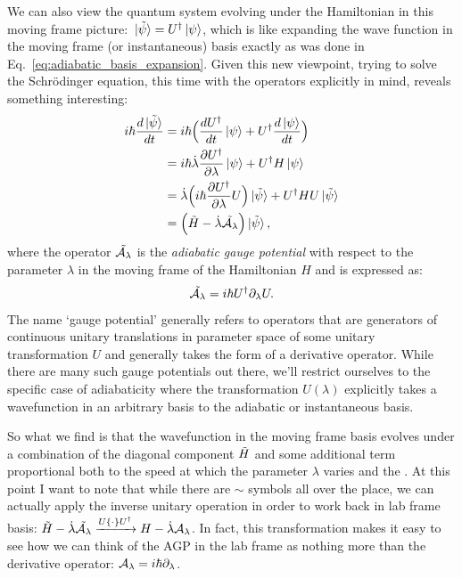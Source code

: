     We can also view the quantum system evolving under the Hamiltonian in this moving frame picture: $\ket*{\Tilde{\psi}} = U^{\dagger}\ket{\psi}$, which is like expanding the wave function in the moving frame (or instantaneous) basis exactly as was done in Eq.~\eqref{eq:adiabatic_basis_expansion}. Given this new viewpoint, trying to solve the Schr\"{o}dinger equation, this time with the operators explicitly in mind, reveals something interesting:
    \begin{equation}\label{eq:moving_frame_schrodinger}
        \begin{aligned}
            i \hbar \frac{d \ket*{\Tilde{\psi}}}{dt} &= i \hbar \Big( \frac{d U^{\dagger}}{dt}\ket*{\psi} + U^{\dagger} \frac{d \ket{\psi}}{dt} \Big) \\
            &= i \hbar \dot{\lambda} \frac{\partial U^{\dagger}}{\partial \lambda}\ket{\psi} + U^{\dagger} H\ket{\psi}\\
            &= \dot{\lambda} \Big(i\hbar \frac{\partial U^{\dagger}}{\partial \lambda}U \Big)\ket*{\Tilde{\psi}} + U^{\dagger} H U \ket*{\Tilde{\psi}} \\
            &= \Big(\Tilde{H} - \dot{\lambda}\Tilde{\mathcal{A}_{\lambda}}\Big) \ket*{\Tilde{\psi}},
        \end{aligned}
    \end{equation}
    where the operator $\Tilde{\mathcal{A}_{\lambda}}$ is the \emph{adiabatic gauge potential} with respect to the parameter $\lambda$ in the moving frame of the Hamiltonian $H$ and is expressed as:
    \begin{equation}\label{eq:AGP_in_terms_of_U}
        \Tilde{\mathcal{A}_{\lambda}} = i\hbar U^{\dagger}\partial_{\lambda} U.
    \end{equation}
    The name `gauge potential' generally refers to operators that are generators of continuous unitary translations in parameter space \cite{kolodrubetz_geometry_2017} of some unitary transformation $U$ and generally takes the form of a derivative operator. While there are many such gauge potentials out there, we'll restrict ourselves to the specific case of adiabaticity where the transformation $U(\lambda)$ explicitly takes a wavefunction in an arbitrary basis to the adiabatic or instantaneous basis. 
    
    So what we find is that the wavefunction in the moving frame basis evolves under a combination of the diagonal component $\Tilde{H}$ and some additional term proportional both to the speed at which the parameter $\lambda$ varies and the . At this point I want to note that while there are $\sim$ symbols all over the place, we can actually apply the inverse unitary operation in order to work back in lab frame basis: $\Tilde{H} - \dot{\lambda}\Tilde{\mathcal{A}_{\lambda}} \xrightarrow{U \{ \cdot \} U^{\dagger}} H - \dot{\lambda} \mathcal{A}_{\lambda}$. In fact, this transformation makes it easy to see how we can think of the AGP in the lab frame as nothing more than the derivative operator: $\mathcal{A}_{\lambda} = i\hbar\partial_{\lambda}$. 

